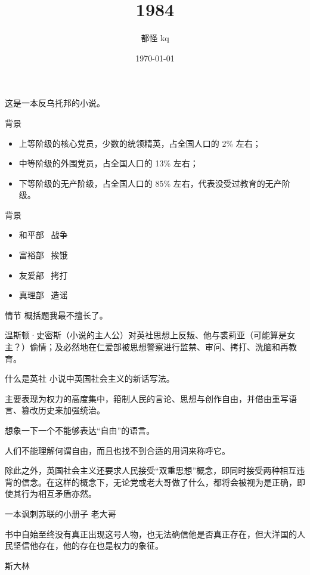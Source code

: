 \documentclass{beamer}
\title{1984}
\subtitle{都怪 kq}
\date{\today}
\begin{document}
  \maketitle
  \begin{frame}
    这是一本反乌托邦的小说。
  \end{frame}
  \begin{frame}{背景}
    \begin{itemize}
      \item 上等阶级的核心党员，少数的统领精英，占全国人口的 2\% 左右；
      \item 中等阶级的外围党员，占全国人口的 13\% 左右；
      \item 下等阶级的无产阶级，占全国人口的 85\% 左右，代表没受过教育的无产阶级。
    \end{itemize}
  \end{frame}
  \begin{frame}{背景}
    \begin{itemize}
      \item 和平部 \ 战争
      \item 富裕部 \ 挨饿
      \item 友爱部 \ 拷打
      \item 真理部 \ 造谣
    \end{itemize}
  \end{frame}
  \begin{frame}{情节}
    概括题我最不擅长了。
    
    温斯顿·史密斯（小说的主人公）对英社思想上反叛、他与裘莉亚（可能算是女主？）偷情；及必然地在仁爱部被思想警察进行监禁、审问、拷打、洗脑和再教育。 
  \end{frame}
  \begin{frame}{什么是英社}
    小说中英国社会主义的新话写法。

    主要表现为权力的高度集中，箝制人民的言论、思想与创作自由，并借由重写语言、篡改历史来加强统治。

    想象一下一个不能够表达“自由”的语言。

    人们不能理解何谓自由，而且也找不到合适的用词来称呼它。
    
    除此之外，英国社会主义还要求人民接受“双重思想”概念，即同时接受两种相互违背的信念。在这样的概念下，无论党或老大哥做了什么，都将会被视为是正确，即使其行为相互矛盾亦然。 
  \end{frame}
  \begin{frame}{一本讽刺苏联的小册子}
    老大哥

    书中自始至终没有真正出现这号人物，也无法确信他是否真正存在，但大洋国的人民坚信他存在，他的存在也是权力的象征。 

    斯大林
  \end{frame}
\end{document}
